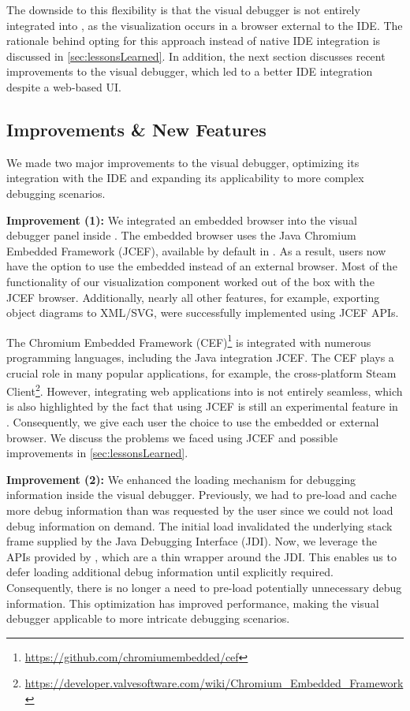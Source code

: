 \documentclass[sigconf]{acmart}
\begin{document}
The downside to this flexibility is that the visual debugger is not entirely integrated into \intellij{}, as the visualization occurs in a browser external to the IDE.
The rationale behind opting for this approach instead of native IDE integration is discussed in \autoref{sec:lessonsLearned}.
In addition, the next section discusses recent improvements to the visual debugger, which led to a better IDE integration despite a web-based UI.

\subsection{Improvements \& New Features} \label{subsec:improvements}
We made two major improvements to the visual debugger, optimizing its integration with the IDE and expanding its applicability to more complex debugging scenarios.

\textbf{Improvement (1):} We integrated an embedded browser into the visual debugger panel inside \intellij{}.
The embedded browser uses the Java Chromium Embedded Framework (JCEF), available by default in \intellij{}.
As a result, users now have the option to use the embedded instead of an external browser.
Most of the functionality of our visualization component worked out of the box with the JCEF browser.
Additionally, nearly all other features, for example, exporting object diagrams to XML/SVG, were successfully implemented using JCEF APIs.

The Chromium Embedded Framework (CEF)\footnote{\url{https://github.com/chromiumembedded/cef}} is integrated with numerous programming languages, including the Java integration JCEF.
The CEF plays a crucial role in many popular applications, for example, the cross-platform Steam Client\footnote{\url{https://developer.valvesoftware.com/wiki/Chromium_Embedded_Framework}}.
However, integrating web applications into \intellij{} is not entirely seamless, which is also highlighted by the fact that using JCEF is still an experimental feature in \intellij{}.
Consequently, we give each user the choice to use the embedded or external browser.
We discuss the problems we faced using JCEF and possible improvements in \autoref{sec:lessonsLearned}.

\textbf{Improvement (2):} We enhanced the loading mechanism for debugging information inside the visual debugger.
Previously, we had to pre-load and cache more debug information than was requested by the user since we could not load debug information on demand.
The initial load invalidated the underlying stack frame supplied by the Java Debugging Interface (JDI).
Now, we leverage the APIs provided by \intellij{}, which are a thin wrapper around the JDI.
This enables us to defer loading additional debug information until explicitly required.
Consequently, there is no longer a need to pre-load potentially unnecessary debug information.
This optimization has improved performance, making the visual debugger applicable to more intricate debugging scenarios.
\end{document}

